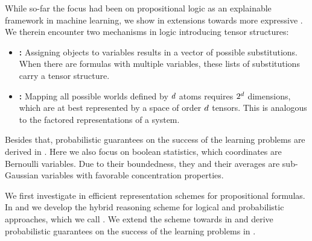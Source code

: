 While so-far the focus had been on propositional logic as an explainable framework in machine learning, we show in  extensions towards more expressive \firstOrderLogic{}.
We therein encounter two mechanisms in logic introducing tensor structures:
\begin{itemize}
    \item \textbf{\SubstitutionStructure{}:} Assigning objects to variables results in a vector of possible substitutions.
    When there are formulas with multiple variables, these lists of substitutions carry a tensor structure.
    \item \textbf{\SemanticStructure{}:} Mapping all possible worlds defined by $d$ atoms requires $2^{d}$ dimensions, which are at best represented by a space of order $d$ tensors.
    This is analogous to the factored representations of a system.
\end{itemize}


Besides that, probabilistic guarantees on the success of the learning problems are derived in .
Here we also focus on boolean statistics, which coordinates are Bernoulli variables.
Due to their boundedness, they and their averages are sub-Gaussian variables with favorable concentration properties.


We first investigate in  efficient representation schemes for propositional formulas.
In  and  we develop the hybrid reasoning scheme for logical and probabilistic approaches, which we call \HybridLogicNetworks{}.
We extend the scheme towards \firstOrderLogic{} in  and derive probabilistic guarantees on the success of the learning problems in .